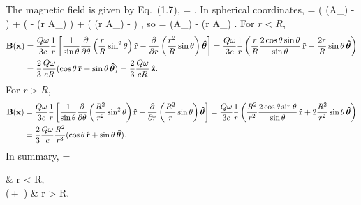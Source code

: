 \begin{solution}
	The magnetic field is given by Eq.~(1.7),
	\beq
		\vB = \grad \times \vA.
	\eeq
	In spherical coordinates,
	\beq
		\grad \times \vA =  \left(\pdv{}{\tht} (\sin\tht A_\vph) -  \right) \rh +  \left(   -  (r A_\vph) \right) \thh +  \left(  (r A_\tht) -  \right) \phh,
	\eeq
	so
	\beq
		\vB =  \pdv{}{\tht} (\sin\tht A_\vph) \rh -   (r A_\vph) \thh.
	\eeq
	For $r < R$,
	\begin{align*}
		\vb{B}(\vb{x}) &= \frac{Q \omega}{3 c} \frac{1}{r} \left[ \frac{1}{\sin\theta} \pdv{}{\theta} \left( \frac{r}{R} \sin^2\theta \right) \vb{\hat{r}} - \pdv{}{r} \left( \frac{r^2}{R} \sin\theta \right) \boldsymbol{\hat{\theta}} \right]
		= \frac{Q \omega}{3 c} \frac{1}{r} \left( \frac{r}{R} \frac{2 \cos\theta \sin\theta}{\sin\theta} \,\vb{\hat{r}} - \frac{2 r}{R} \sin\theta \,\boldsymbol{\hat{\theta}} \right) \\
		&= \frac{2}{3} \frac{Q \omega}{c R} (\cos\theta \,\vb{\hat{r}} - \sin\theta \,\boldsymbol{\hat{\theta}})
		= \frac{2}{3} \frac{Q \omega}{c R} \,\vb{\hat{z}}.
	\end{align*}
	For $r > R$,
	\begin{align*}
		\vb{B}(\vb{x}) &= \frac{Q \omega}{3 c} \frac{1}{r} \left[ \frac{1}{\sin\theta} \pdv{}{\theta} \left( \frac{R^2}{r^2} \sin^2\theta \right) \vb{\hat{r}} - \pdv{}{r} \left( \frac{R^2}{r} \sin\theta \right) \boldsymbol{\hat{\theta}} \right]
		= \frac{Q \omega}{3 c} \frac{1}{r} \left( \frac{R^2}{r^2} \frac{2 \cos\theta \sin\theta}{\sin\theta} \,\vb{\hat{r}} + 2 \frac{R^2}{r^2} \sin\theta \,\boldsymbol{\hat{\theta}} \right) \\
		&= \frac{2}{3} \frac{Q \omega}{c} \frac{R^2}{r^3} (\cos\theta \,\vb{\hat{r}} + \sin\theta \,\boldsymbol{\hat{\theta}}).
	\end{align*}
	In summary,
	\beq
		\vBx =   \begin{cases}
			 & r < R, \\[2ex]
			 (\cos\tht \,\rh + \sin\tht \,\thh) & r > R.
		\end{cases}
	\eeq
\end{solution}
\vfix